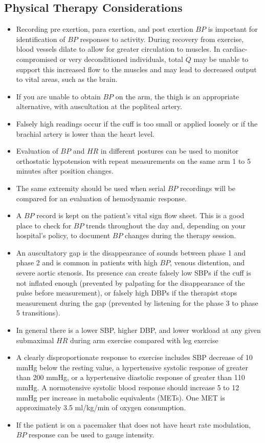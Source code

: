 \subsection{Physical Therapy Considerations}
\begin{itemize}
\item Recording pre exertion, para exertion, and post exertion $BP$ is important for identification of $BP$ responses to activity. During recovery from exercise, blood vessels dilate to allow for greater circulation to muscles. In cardiac-compromised or very deconditioned individuals, total $\dot{Q}$ may be unable to support this increased flow to the muscles and may lead to decreased output to vital areas, such as the brain.
\item If you are unable to obtain $BP$ on the arm, the thigh is an appropriate alternative, with auscultation at the popliteal artery.
\item Falsely high readings occur if the cuff is too small or applied loosely or if the brachial artery is lower than the heart level.
\item Evaluation of $BP$ and $HR$ in different postures can be used to monitor orthostatic hypotension with repeat measurements on the same arm 1 to 5 minutes after position changes.
\item The same extremity should be used when serial $BP$ recordings will be compared for an evaluation of hemodynamic response.
\item A $BP$ record is kept on the patient’s vital sign flow sheet. This is a good place to check for $BP$ trends throughout the day and, depending on your hospital’s policy, to document $BP$ changes during the therapy session.
\item An auscultatory gap is the disappearance of sounds between phase 1 and phase 2 and is common in patients with high $BP$, venous distention, and severe aortic stenosis. Its presence can create falsely low SBPs if the cuff is not inflated enough (prevented by palpating for the disappearance of the pulse before measurement), or falsely high DBPs if the therapist stops measurement during the gap (prevented by listening for the phase 3 to phase 5 transitions).
\item In general there is a lower SBP, higher DBP, and lower workload at any given submaximal $HR$ during arm exercise compared with leg exercise \cite{dias_differences_2022}
\item A clearly disproportionate response to exercise includes SBP decrease of 10 mmHg below the resting value, a hypertensive systolic response of greater than 200 mmHg, or a hypertensive diastolic response of greater than 110 mmHg. A normotensive systolic blood response should increase 5 to 12 mmHg per increase in metabolic equivalents (METs). One MET is approximately 3.5 ml/kg/min of oxygen consumption.
\item If the patient is on a pacemaker that does not have heart rate modulation, $BP$ response can be used to gauge intensity. 
\end{itemize}


